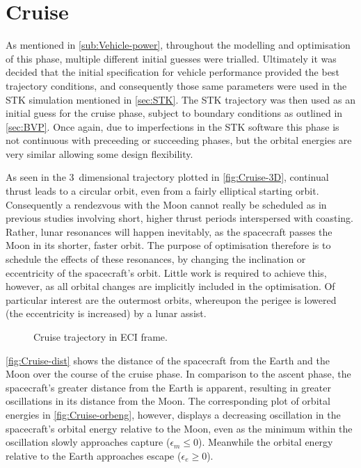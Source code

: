 
\clearpage

\section{Cruise}
As mentioned in \autoref{sub:Vehicle-power}, throughout the modelling and optimisation of this phase, multiple different initial guesses were trialled. Ultimately it was decided that the initial specification for vehicle performance provided the best trajectory conditions, and consequently those same parameters were used in the STK simulation mentioned in \autoref{sec:STK}. The STK trajectory was then used as an initial guess for the cruise phase, subject to boundary conditions as outlined in \autoref{sec:BVP}. Once again, due to imperfections in the STK software this phase is not continuous with preceeding or succeeding phases, but the orbital energies are very similar allowing some design flexibility.

As seen in the 3~dimensional trajectory plotted in \autoref{fig:Cruise-3D}, continual thrust leads to a circular orbit, even from a fairly elliptical starting orbit. Consequently a rendezvous with the Moon cannot really be scheduled as in previous studies involving short, higher thrust periods interspersed with coasting. Rather, lunar resonances will happen inevitably, as the spacecraft passes the Moon in its shorter, faster orbit. The purpose of optimisation therefore is to schedule the effects of these resonances, by changing the inclination or eccentricity of the spacecraft's orbit. Little work is required to achieve this, however, as all orbital changes are implicitly included in the optimisation. Of particular interest are the outermost orbits, whereupon the perigee is lowered (the eccentricity is increased) by a lunar assist.

\begin{figure}
\centering
\def\svgwidth{\figurewidth}

\caption{Cruise trajectory in ECI frame.}
\label{fig:Cruise-3D}
\end{figure}

\autoref{fig:Cruise-dist} shows the distance of the spacecraft from the Earth and the Moon over the course of the cruise phase. In comparison to the ascent phase, the spacecraft's greater distance from the Earth is apparent, resulting in greater oscillations in its distance from the Moon. The corresponding plot of orbital energies in \autoref{fig:Cruise-orbeng}, however, displays a decreasing oscillation in the spacecraft's orbital energy relative to the Moon, even as the minimum within the oscillation slowly approaches capture ($\epsilon_m\le0$). Meanwhile the orbital energy relative to the Earth approaches escape ($\epsilon_e\ge0$). 

